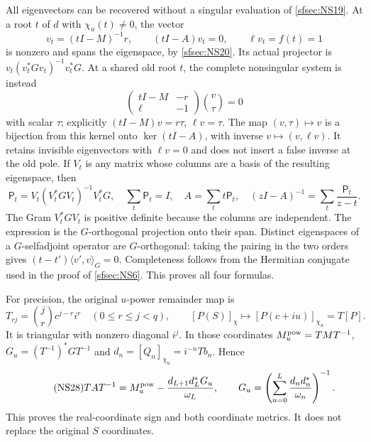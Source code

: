 \documentclass[11pt]{article}
\begin{document}
All eigenvectors can be recovered without a singular
evaluation of \eqref{sfsec:NS19}. At a root $t$ of $d$ with
$\chi_u(t)\ne0$, the vector
\begin{equation}\tag{NS24}\label{sfsec:NS24}
v_t=(tI-M)^{-1}r,\qquad
(tI-A)v_t=0,\qquad \ell v_t=f(t)=1
\end{equation}
is nonzero and spans the eigenspace, by \eqref{sfsec:NS20}.
Its actual projector is
$v_t(v_t^*Gv_t)^{-1}v_t^*G$.
At a shared old root $t$, the complete nonsingular
system is instead
\begin{equation}\tag{NS25}\label{sfsec:NS25}
\begin{pmatrix}tI-M&-r\\ \ell&-1\end{pmatrix}
\binom v\tau=0
\end{equation}
with scalar $\tau$; explicitly
$(tI-M)v=r\tau$, $\ell v=\tau$.
The map $(v,\tau)\mapsto v$ is a bijection from this
kernel onto $\ker(tI-A)$, with inverse
$v\mapsto(v,\ell v)$. It retains invisible eigenvectors
with $\ell v=0$ and does not insert a false inverse
at the old pole. If $V_t$ is any matrix whose columns
are a basis of the resulting eigenspace, then
\begin{equation}\tag{NS26}\label{sfsec:NS26}
\mathsf P_t=V_t(V_t^*GV_t)^{-1}V_t^*G,\quad
\sum_t\mathsf P_t=I,\quad
A=\sum_t t\mathsf P_t,\quad
(zI-A)^{-1}=\sum_t\frac{\mathsf P_t}{z-t}.
\end{equation}
The Gram $V_t^*GV_t$ is positive definite because the
columns are independent. The expression is the
$G$-orthogonal projection onto their span. Distinct
eigenspaces of a $G$-selfadjoint operator are
$G$-orthogonal: taking the pairing in the two orders
gives $(t-t')\langle v',v\rangle_G=0$.
Completeness follows from the Hermitian conjugate used
in the proof of \eqref{sfsec:NS6}. This proves all four formulas.

For precision, the original $u$-power remainder map is
\begin{equation}\tag{NS27}\label{sfsec:NS27}
T_{rj}=\binom jr c^{j-r}i^r\quad(0\leq r\leq j<q),\qquad
[P(S)]_\chi\longmapsto[P(c+iu)]_{\chi_u}=T[P].
\end{equation}
It is triangular with nonzero diagonal $i^j$.
In those coordinates
$M_u^{\rm pow}=TMT^{-1}$,
$G_u=(T^{-1})^*GT^{-1}$ and
$d_n=[Q_n]_{\chi_u}=i^{-n}Tb_n$. Hence
\begin{equation}\tag{NS28}\label{sfsec:NS28}
TAT^{-1}
=M_u^{\rm pow}-\frac{d_{L+1}d_L^*G_u}{\omega_L},\qquad
G_u=\left(\sum_{n=0}^L
\frac{d_nd_n^*}{\omega_n}\right)^{-1}.
\end{equation}
This proves the real-coordinate sign and both coordinate
metrics. It does not replace the original $S$ coordinates.
\end{document}
